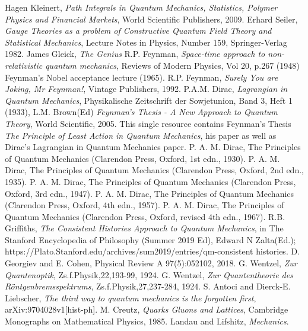 \documentclass[a4paper]{JHEP3}
\begin{document}
\begin{thebibliography}{}
 Hagen Kleinert, {\it Path Integrals in Quantum Mechanics, Statistics, Polymer Physics and Financial Markets}, World
Scientific Publishers, 2009.
 Erhard Seiler, {\it Gauge Theories as a problem of Constructive Quantum Field Theory and Statistical Mechanics}, Lecture
Notes in Physics, Number 159, Springer-Verlag 1982.
 James Gleick, {\it The Genius}
 R.P. Feynman, {\it Space-time approach to non-relativistic quantum mechanics}, Reviews of Modern Physics, Vol 20, p.267
(1948)
 Feynman's Nobel acceptance lecture (1965).
 R.P. Feynman, {\it Surely You are Joking, Mr Feynman!}, Vintage Publishers, 1992.
 P.A.M. Dirac, {\it Lagrangian in Quantum Mechanics}, 
Physikalische Zeitschrift der Sowjetunion, Band 3, Heft 1 (1933),
 L.M. Brown(Ed) {\it Feynman's Thesis - A New Approach to Quantum Theory}, World Scientific, 2005. This single
resource contains Feynman's Thesis {\it The Principle of Least Action in Quantum Mechanics}, his paper as well as Dirac's Lagrangian in Quantum Mechanics paper.
 P. A. M. Dirac, The Principles of Quantum Mechanics (Clarendon Press, Oxford, 1st edn., 1930). 
 P. A. M. Dirac, The Principles of Quantum Mechanics (Clarendon Press, Oxford, 2nd edn., 1935). 
 P. A. M. Dirac, The Principles of Quantum Mechanics (Clarendon Press, Oxford, 3rd edn., 1947). 
 P. A. M. Dirac, The Principles of Quantum Mechanics (Clarendon Press, Oxford, 4th edn., 1957). 
 P. A. M. Dirac, The Principles of Quantum Mechanics (Clarendon Press, Oxford, revised 4th edn., 1967). 
 R.B. Griffiths, {\it The Consistent Histories Approach to Quantum Mechanics}, in The Stanford Encyclopedia of
Philosophy (Summer 2019 Ed), Edward N Zalta(Ed.); https://Plato.Stanford.edu/archives/sum2019/entries/qm-consistent histories.
 D. Georgiev and E. Cohen, Physical Review A 97(5):052102, 2018.
 G. Wentzel, {\it Zur Quantenoptik}, Zs.f.Physik,22,193-99, 1924.
 G. Wentzel, {\it Zur Quantentheorie des R\"ontgenbremsspektrums}, Zs.f.Physik,27,237-284, 1924.
 S. Antoci and Dierck-E. Liebscher, {\it The third way to quantum mechanics is the forgotten first}, arXiv:9704028v1[hist-ph].
 M. Creutz, {\it Quarks Gluons and Lattices}, Cambridge Monographs on Mathematical Physics, 1985.
 Landau and Lifshitz, {\it Mechanics}.
\end{thebibliography}
\end{document}
